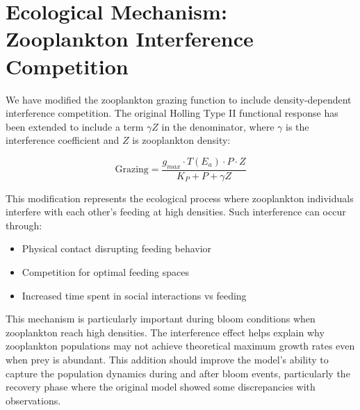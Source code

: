 \section{Ecological Mechanism: Zooplankton Interference Competition}

We have modified the zooplankton grazing function to include density-dependent interference competition. The original Holling Type II functional response has been extended to include a term $\gamma Z$ in the denominator, where $\gamma$ is the interference coefficient and $Z$ is zooplankton density:

\[ \text{Grazing} = \frac{g_{max} \cdot T(E_a) \cdot P \cdot Z}{K_P + P + \gamma Z} \]

This modification represents the ecological process where zooplankton individuals interfere with each other's feeding at high densities. Such interference can occur through:
\begin{itemize}
\item Physical contact disrupting feeding behavior
\item Competition for optimal feeding spaces
\item Increased time spent in social interactions vs feeding
\end{itemize}

This mechanism is particularly important during bloom conditions when zooplankton reach high densities. The interference effect helps explain why zooplankton populations may not achieve theoretical maximum growth rates even when prey is abundant. This addition should improve the model's ability to capture the population dynamics during and after bloom events, particularly the recovery phase where the original model showed some discrepancies with observations.
